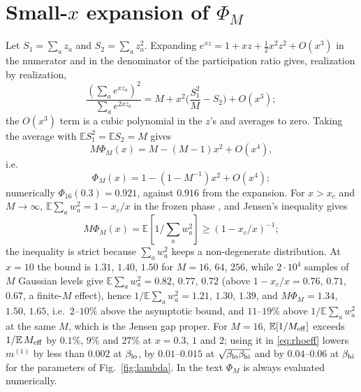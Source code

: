 \documentclass[11pt,a4paper]{article}
\newcommand{\E}{\mathbb{E}}
\newcommand{\Meff}{M_{\rm eff}}
\begin{document}
\section{Small-$x$ expansion of $\Phi_M$}
Let $S_1=\sum_az_a$ and $S_2=\sum_az_a^2$. Expanding $e^{xz}=1+xz+\frac12x^2z^2+O(x^3)$ in the numerator and in the denominator of the participation ratio gives, realization by realization,
\begin{equation*}
\frac{(\sum_ae^{xz_a})^2}{\sum_ae^{2xz_a}}=M+x^2\Big(\frac{S_1^2}{M}-S_2\Big)+O(x^3);
\end{equation*}
the $O(x^3)$ term is a cubic polynomial in the $z$'s and averages to zero. Taking the average with $\E S_1^2=\E S_2=M$ gives
\begin{equation*}
M\Phi_M(x)=M-(M-1)x^2+O(x^4),
\end{equation*}
i.e.\
\begin{equation*}
\Phi_M(x)=1-(1-M^{-1})x^2+O(x^4);
\end{equation*}
numerically $\Phi_{16}(0.3)=0.921$, against $0.916$ from the expansion. For $x>x_c$ and $M\to\infty$, $\E\sum_aw_a^2=1-x_c/x$ in the frozen phase \cite{Derrida1985b,MPV1985}, and Jensen's inequality gives
\begin{equation*}
M\Phi_M(x)=\E[1/\sum_aw_a^2]\ge(1-x_c/x)^{-1};
\end{equation*}
the inequality is strict because $\sum_aw_a^2$ keeps a non-degenerate distribution. At $x=10$ the bound is $1.31$, $1.40$, $1.50$ for $M=16$, $64$, $256$, while $2\cdot10^4$ samples of $M$ Gaussian levels give $\E\sum_aw_a^2=0.82$, $0.77$, $0.72$ (above $1-x_c/x=0.76$, $0.71$, $0.67$, a finite-$M$ effect), hence $1/\E\sum_aw_a^2=1.21$, $1.30$, $1.39$, and $M\Phi_M=1.34$, $1.50$, $1.65$, i.e.\ $2$--$10\%$ above the asymptotic bound, and $11$--$19\%$ above $1/\E\sum_aw_a^2$ at the same $M$, which is the Jensen gap proper. For $M=16$, $\E[1/\Meff]$ exceeds $1/\E\,\Meff$ by $0.1\%$, $9\%$ and $27\%$ at $x=0.3$, $1$ and $2$; using it in \eqref{eq:rhoeff} lowers $m^{(1)}$ by less than $0.002$ at $\beta_{\rm lo}$, by $0.01$--$0.015$ at $\sqrt{\beta_{\rm lo}\beta_{\rm hi}}$ and by $0.04$--$0.06$ at $\beta_{\rm hi}$ for the parameters of Fig.\ \ref{fig:lambda}. In the text $\Phi_M$ is always evaluated numerically.
\end{document}
